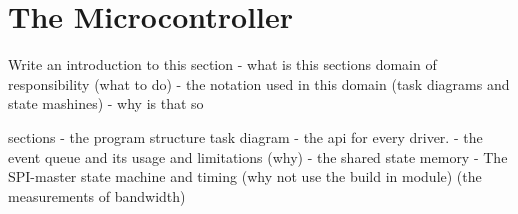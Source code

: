 
\section{The Microcontroller}
\label{sec:TheMicrocontroller}

Write an introduction to this section
- what is this sections domain of responsibility (what to do)
- the notation used in this domain (task diagrams and state mashines)
- why is that so

sections
- the program structure task diagram
	- the api for every driver. 
	- the event queue and its usage and limitations (why)
	- the shared state memory 
	- The SPI-master state machine and timing (why not use the build in module) (the measurements of bandwidth)
	











